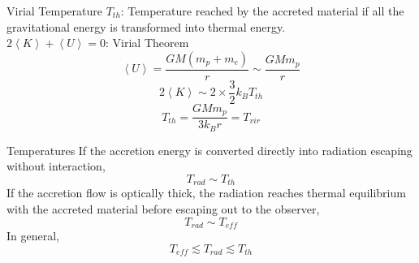 \documentclass{beamer}
\begin{document}
\begin{frame}{Virial Temperature}	
	$T_{th}$: Temperature reached by the accreted material if all the gravitational energy is transformed into thermal energy.\\
	\pause
	$2\left\langle K \right\rangle + \left\langle U \right\rangle = 0$: Virial Theorem
	\pause
	\[ \left\langle U \right\rangle = \frac{GM(m_p + m_e)}{r}\sim \frac{GMm_p}{r} \]
	\pause
	\[ 2\left\langle K \right\rangle \sim 2 \times \frac{3}{2} k_B T_{th} \]
	\pause
	\[ T_{th} = \frac{GMm_p}{3k_B r} = T_{vir}\]
\end{frame}

\begin{frame}{Temperatures}	
	If the accretion energy is converted directly into radiation escaping without interaction,
	\pause
	\[ T_{rad} \sim T_{th}\]
	\pause
	If the accretion flow is optically thick, the radiation reaches thermal equilibrium with the accreted material before escaping out to the observer,
	\pause
	\[ T_{rad} \sim T_{eff}\]
	\pause
	\bigskip
	In general,
	\pause
	\[ T_{eff} \lesssim T_{rad} \lesssim T_{th}\]
	
\end{frame}
\end{document}
